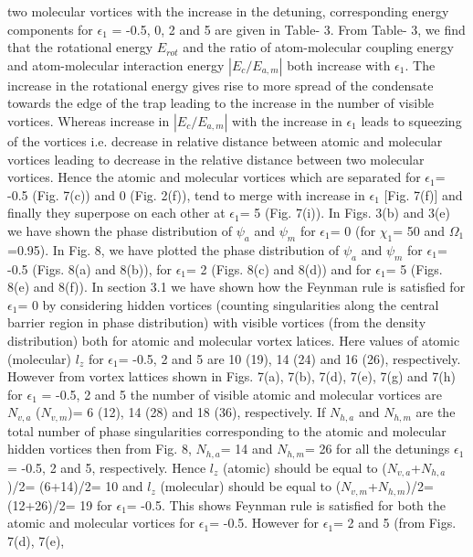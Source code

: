 \documentclass[10pt,a4paper]{article}
\begin{document}
two molecular vortices with the
increase in the detuning, corresponding energy components for
$\epsilon_1$ = -0.5, 0, 2 and 5 are given in Table- 3. From Table-
3, we find that the rotational energy $E_{rot}$ and the ratio of
atom-molecular coupling energy and atom-molecular interaction
energy $|E_c/ {E_{a,m}}|$ both increase with $\epsilon_1$. The
increase in the rotational energy gives rise to more spread of the
condensate towards the edge of the trap leading to the increase in
the number of visible vortices. Whereas increase in $|E_c/
{E_{a,m}}|$ with the increase in $\epsilon_1$ leads to squeezing
of the vortices i.e. decrease in relative distance between atomic and
molecular vortices leading to decrease in the relative distance between two molecular
vortices. Hence the atomic and molecular vortices which are
separated for $\epsilon_1$= -0.5 (Fig. 7(c)) and 0 (Fig. 2(f)),
tend to merge with increase in $\epsilon_1$ [Fig. 7(f)] and
finally they superpose on each other at $\epsilon_1$= 5 (Fig.
7(i)). In Figs. 3(b) and 3(e) we have shown the phase distribution
of $\psi_a$ and $\psi_m$ for $\epsilon_1$= 0 (for $\chi_1$= 50 and
$\Omega_1$=0.95). In Fig. 8, we have plotted the phase
distribution of $\psi_a$ and $\psi_m$ for $\epsilon_1$= -0.5 (Figs. 8(a) and
8(b)), for $\epsilon_1$= 2 (Figs. 8(c) and 8(d)) and for $\epsilon_1$= 5 
(Figs. 8(e) and 8(f)). In section 3.1
we have shown how the Feynman rule is satisfied for $\epsilon_1$= 0
by considering hidden vortices (counting singularities along the
central barrier region in phase distribution) with visible vortices (from
the density distribution) both for atomic and molecular vortex
latices. Here values of atomic
(molecular) $l_z$ for $\epsilon_1$= -0.5, 2 and 5 are 10 (19), 14 (24) and 16 (26), 
respectively. However from vortex lattices shown in
Figs. 7(a), 7(b), 7(d), 7(e), 7(g) and 7(h) for $\epsilon_1$ = -0.5, 2
and 5 the number of visible atomic and molecular vortices are
$N_{v,a}$ ($N_{v,m}$)= 6 (12), 14 (28) and 18 (36), respectively.
If $N_{h,a}$ and $N_{h,m}$
are the total number of phase singularities corresponding to the 
atomic and molecular hidden vortices then from Fig. 8, $N_{h,a}$= 14 and $N_{h,m}$= 26 for 
all the detunings  $\epsilon_1$= -0.5, 2 and 5, respectively. Hence $l_z$ (atomic) should 
be equal to ($N_{v,a}$+$N_{h,a}$)/2= (6+14)/2= 10 and $l_z$ (molecular) should be equal 
to  ($N_{v,m}$+$N_{h,m}$)/2= (12+26)/2= 19 for $\epsilon_1$= -0.5. This shows Feynman rule 
is satisfied for both the atomic and molecular vortices for $\epsilon_1$= -0.5. However for $\epsilon_1$= 2 and 5 (from Figs. 7(d), 7(e), 
\end{document}
